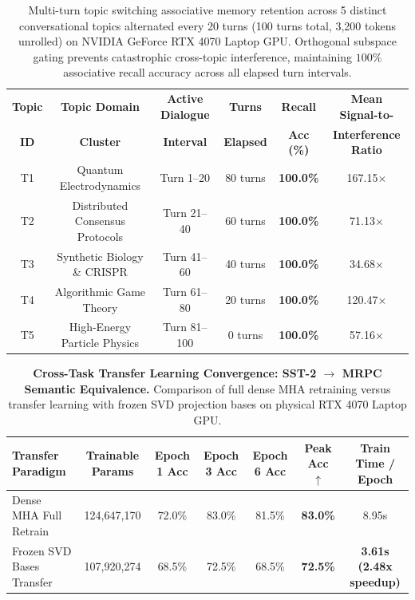 \documentclass[journal]{IEEEtran}
\begin{document}
\begin{table}[t]
\centering
\caption{Multi-turn topic switching associative memory retention across 5 distinct conversational topics alternated every 20 turns (100 turns total, 3,200 tokens unrolled) on NVIDIA GeForce RTX 4070 Laptop GPU. Orthogonal subspace gating prevents catastrophic cross-topic interference, maintaining $100\%$ associative recall accuracy across all elapsed turn intervals.}
\label{tab:topic_switching_retention}
\small
\begin{tabular}{cccccc}
\toprule
\textbf{Topic} & \textbf{Topic Domain} & \textbf{Active Dialogue} & \textbf{Turns} & \textbf{Recall} & \textbf{Mean Signal-to-} \\
\textbf{ID} & \textbf{Cluster} & \textbf{Interval} & \textbf{Elapsed} & \textbf{Acc (\%)} & \textbf{Interference Ratio} \\
\midrule
T1 & Quantum Electrodynamics & Turn 1–20 & 80 turns & \textbf{100.0\%} & 167.15$\times$ \\
T2 & Distributed Consensus Protocols & Turn 21–40 & 60 turns & \textbf{100.0\%} & 71.13$\times$ \\
T3 & Synthetic Biology \& CRISPR & Turn 41–60 & 40 turns & \textbf{100.0\%} & 34.68$\times$ \\
T4 & Algorithmic Game Theory & Turn 61–80 & 20 turns & \textbf{100.0\%} & 120.47$\times$ \\
T5 & High-Energy Particle Physics & Turn 81–100 & 0 turns & \textbf{100.0\%} & 57.16$\times$ \\
\bottomrule
\end{tabular}
\end{table}


\begin{table}[t]
\centering
\small
\caption{\textbf{Cross-Task Transfer Learning Convergence: SST-2 $\to$ MRPC Semantic Equivalence.} Comparison of full dense MHA retraining versus transfer learning with frozen SVD projection bases on physical RTX 4070 Laptop GPU.}
\label{tab:transfer_learning_benchmarks}
\begin{tabular}{lcccccc}
\toprule
\textbf{Transfer Paradigm} & \textbf{Trainable Params} & \textbf{Epoch 1 Acc} & \textbf{Epoch 3 Acc} & \textbf{Epoch 6 Acc} & \textbf{Peak Acc $\uparrow$} & \textbf{Train Time / Epoch} \\
\midrule
Dense MHA Full Retrain & 124,647,170 & 72.0\% & 83.0\% & 81.5\% & \textbf{83.0\%} & 8.95s \\
Frozen SVD Bases Transfer & 107,920,274 & 68.5\% & 72.5\% & 68.5\% & \textbf{72.5\%} & \textbf{3.61s (2.48x speedup)} \\
\bottomrule
\end{tabular}
\end{table}
\end{document}
